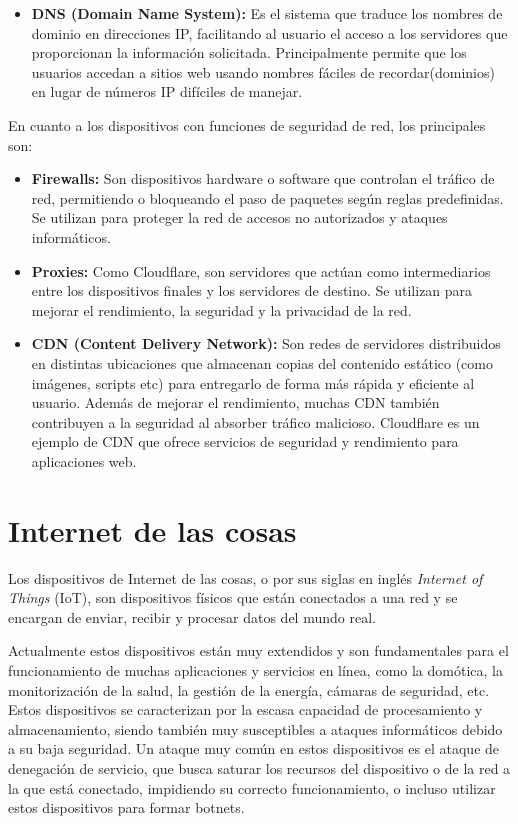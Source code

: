 \begin{itemize}
	\item \textbf{DNS (Domain Name System):} Es el sistema que traduce los nombres de dominio en direcciones IP, facilitando al usuario el acceso a los servidores que proporcionan la información solicitada. Principalmente permite que los usuarios accedan a sitios web usando nombres fáciles de recordar(dominios) en lugar de números IP difíciles de manejar.

\end{itemize}


En cuanto a los dispositivos con funciones de seguridad de red, los principales son:
\begin{itemize}
	\item \textbf{Firewalls:} Son dispositivos hardware o software que controlan el tráfico de red, permitiendo o bloqueando el paso de paquetes según reglas predefinidas. Se utilizan para proteger la red de accesos no autorizados y ataques informáticos. ~\cite{SushilJajodia2025}

	\item \textbf{Proxies:} Como Cloudflare, son servidores que actúan como intermediarios entre los dispositivos finales y los servidores de destino. Se utilizan para mejorar el rendimiento, la seguridad y la privacidad de la red. ~\cite{SushilJajodia2025}

	\item \textbf{CDN (Content Delivery Network):} Son redes de servidores distribuidos en distintas ubicaciones que almacenan copias del contenido estático (como imágenes, scripts etc) para entregarlo de forma más rápida y eficiente al usuario. Además de mejorar el rendimiento, muchas CDN también contribuyen a la seguridad al absorber tráfico malicioso. Cloudflare es un ejemplo de CDN que ofrece servicios de seguridad y rendimiento para aplicaciones web.
\end{itemize}


\section{Internet de las cosas}
Los dispositivos de Internet de las cosas, o por sus siglas en inglés \textit{Internet of Things} (IoT), son dispositivos físicos que están conectados a una red y se encargan de enviar, recibir y procesar datos del mundo real. ~\cite{AzizAlKabir2023} 

Actualmente estos dispositivos están muy extendidos y son fundamentales para el funcionamiento de muchas aplicaciones y servicios en línea, como la domótica, la monitorización de la salud, la gestión de la energía, cámaras de seguridad, etc. Estos dispositivos se caracterizan por la escasa capacidad de procesamiento y almacenamiento, siendo también muy susceptibles a ataques informáticos debido a su baja seguridad. Un ataque muy común en estos dispositivos es el ataque de denegación de servicio, que busca saturar los recursos del dispositivo o de la red a la que está conectado, impidiendo su correcto funcionamiento, o incluso utilizar estos dispositivos para formar botnets. ~\cite{kolias2017}



